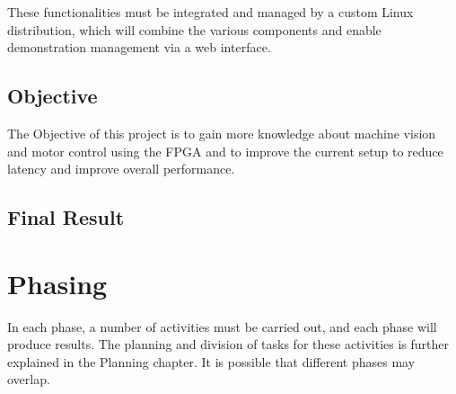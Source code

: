 \documentclass{article}
\begin{document}
These functionalities must be integrated and managed by a custom
Linux distribution, which will combine the various components and enable
demonstration management via a web interface.

\subsection{Objective}
The Objective of this project is to gain more knowledge about machine vision and motor control using the FPGA 
and to improve the current setup to reduce latency and improve overall performance.
\subsection{Final Result}

\newpage
\section{Phasing}
In each phase, a number of activities must be carried out, and each phase will produce results.
The planning and division of tasks for these activities is further explained in the Planning chapter.
It is possible that different phases may overlap.

%
\end{document}
